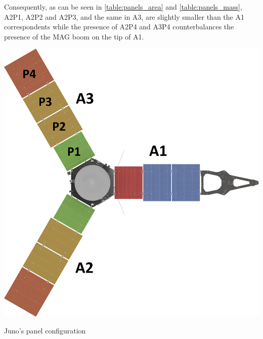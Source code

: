\vspace{-3mm}

Consequently, as can be seen in \autoref{table:panels_area} and \autoref{table:panels_mass}, A2P1, A2P2 and A2P3, and the same in A3, are slightly smaller than the A1 correspondents while the presence of A2P4 and A3P4 counterbalances the presence of the MAG boom on the tip of A1.

\vspace{3mm}

\begin{minipage}{0.4\linewidth}
    \centering
    \captionsetup{type=figure}
    \includegraphics[width=\linewidth]{Images/Juno panels.jpg}
    \caption{Juno's panel configuration}
    \label{fig:panel_config}
\end{minipage}\hfill
